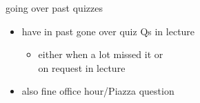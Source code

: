 \begin{frame}{going over past quizzes}
    \begin{itemize}
    \item have in past gone over quiz Qs in lecture
        \begin{itemize}
        \item either when a lot missed it or \\
             on request in lecture
         \end{itemize}
    \item also fine office hour/Piazza question
    \end{itemize}
\end{frame}
